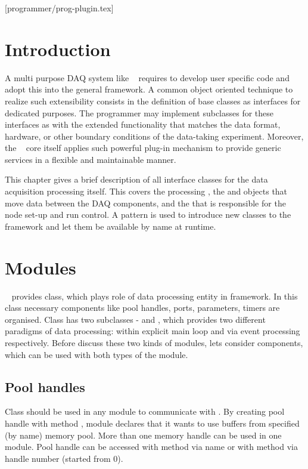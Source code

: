 [programmer/prog-plugin.tex]
\section{Introduction}
A multi purpose DAQ system like \dabc~ requires to develop user specific code and adopt
this into the general framework. A common object oriented technique to realize such
extensibility consists in the definition of base classes as interfaces for dedicated purposes.
The programmer may implement subclasses for these interfaces as 
with the extended functionality that matches the data format, hardware, or other boundary conditions of the
data-taking experiment. Moreover, the  \dabc~ core itself applies such powerful plug-in mechanism to provide 
generic services in a flexible and maintainable manner.   

This chapter gives a brief description of all interface classes for the data acquisition 
processing itself. This covers the processing , the  and 
 objects that move data between the DAQ components, 
and the  that is responsible for the node set-up and run control.
A  pattern is used to introduce new classes to the framework and let them
be available by name at runtime.


\section{Modules}

\dabc~ provides  class, which plays role of data processing entity in framework. 
In this class necessary components like pool handles, ports, parameters, timers are organised.
Class  has two subclasses -  and ,
which provides two different paradigms of data processing: within explicit main loop and via event processing respectively.
Before discuss these two kinds of modules, lets consider components, which can be used with both types 
of the module.


\subsection{Pool handles}

Class  should be used in any module to communicate with .
By creating pool handle with method , module declares that it 
wants to use buffers from specified (by name) memory pool. 
More than one memory handle can be used in one module. 
Pool handle can be accessed with method  via name or
with method  via handle number (started from 0).

